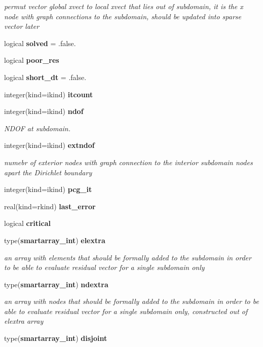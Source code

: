\begin{DoxyCompactItemize}
\begin{DoxyCompactList}\small\item\em permut vector global xvect to local xvect that lies out of subdomain, it is the x node with graph connections to the subdomain, should be updated into sparse vector later \end{DoxyCompactList}\item 
logical {\bf solved} = .false.
\item 
logical {\bf poor\+\_\+res}
\item 
logical {\bf short\+\_\+dt} = .false.
\item 
integer(kind=ikind) {\bf itcount}
\item 
integer(kind=ikind) {\bf ndof}
\begin{DoxyCompactList}\small\item\em N\+D\+OF at subdomain. \end{DoxyCompactList}\item 
integer(kind=ikind) {\bf extndof}
\begin{DoxyCompactList}\small\item\em numebr of exterior nodes with graph connection to the interior subdomain nodes apart the Dirichlet boundary \end{DoxyCompactList}\item 
integer(kind=ikind) {\bf pcg\+\_\+it}
\item 
real(kind=rkind) {\bf last\+\_\+error}
\item 
logical {\bf critical}
\item 
type({\bf smartarray\+\_\+int}) {\bf elextra}
\begin{DoxyCompactList}\small\item\em an array with elements that should be formally added to the subdomain in order to be able to evaluate residual vector for a single subdomain only \end{DoxyCompactList}\item 
type({\bf smartarray\+\_\+int}) {\bf ndextra}
\begin{DoxyCompactList}\small\item\em an array with nodes that should be formally added to the subdomain in order to be able to evaluate residual vector for a single subdomain only, constructed out of \textquotesingle{}elextra\textquotesingle{} array \end{DoxyCompactList}\item 
type({\bf smartarray\+\_\+int}) {\bf disjoint}
\item 

\end{DoxyCompactItemize}
